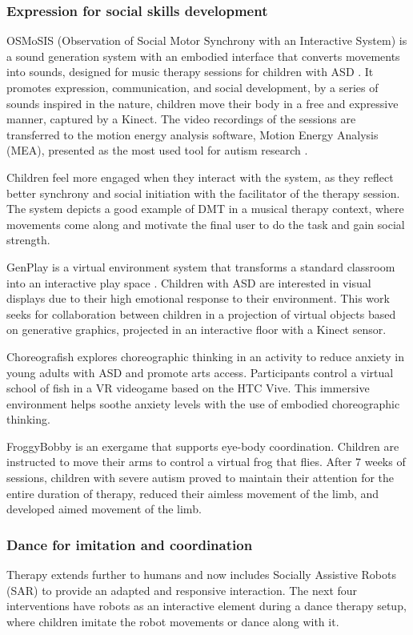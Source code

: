 \documentclass[a4paper,fleqn]{cas-sc}
\begin{document}
\subsubsection{Expression for social skills development} 

OSMoSIS (Observation of Social Motor Synchrony with an Interactive System) is a sound generation system with an embodied interface that converts movements into sounds, designed for music therapy sessions for children with ASD \cite{Ragone20, Osmosis20}. It promotes expression, communication, and social development, by a series of sounds inspired in the nature, children move their body in a free and expressive manner, captured by a Kinect. The video recordings of the sessions are transferred to the motion energy analysis software, Motion Energy Analysis (MEA), presented as the most used tool for autism research \cite{Ragone22}.

Children feel more engaged when they interact with the system, as they reflect better synchrony and social initiation with the facilitator of the therapy session. The system depicts a good example of DMT in a musical therapy context, where movements come along and motivate the final user to do the task and gain social strength.

GenPlay is a virtual environment system that transforms a standard classroom into an interactive play space \cite{Crowell18}. Children with ASD are interested in visual displays due to their high emotional response to their environment. This work seeks for collaboration between children in a projection of virtual objects based on generative graphics, projected in an interactive floor with a Kinect sensor.

Choreografish explores choreographic thinking in an activity to reduce anxiety in young adults with ASD \cite{AltizerJr18} and promote arts access. Participants control a virtual school of fish in a VR videogame based on the HTC Vive. This immersive environment helps soothe anxiety levels with the use of embodied choreographic thinking.

FroggyBobby is an exergame that supports eye-body coordination\cite{Caro17}. Children are instructed to move their arms to control a virtual frog that flies. After 7 weeks of sessions, children with severe autism proved to maintain their attention for the entire duration of therapy, reduced their aimless movement of the limb, and developed aimed movement of the limb.


\subsubsection{Dance for imitation and coordination}  %
Therapy extends further to humans and now includes Socially Assistive Robots (SAR) to provide an adapted and responsive interaction. The next four interventions have robots as an interactive element during a dance therapy setup, where children imitate the robot movements or dance along with it.
\end{document}
